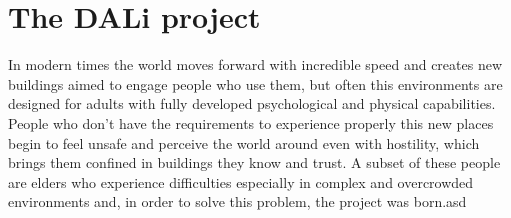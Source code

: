 \chapter{The DALi project}

In modern times the world moves forward with incredible speed and creates new buildings aimed to engage people who use them, but often this environments are designed for adults with fully developed psychological and physical capabilities.
People who don't have the requirements to experience properly this new places begin to feel unsafe and perceive the world around even with hostility, which brings them confined in buildings they know and trust.
A subset of these people are elders who experience difficulties especially in complex and overcrowded environments and, in order to solve this problem, the project was born.asd


